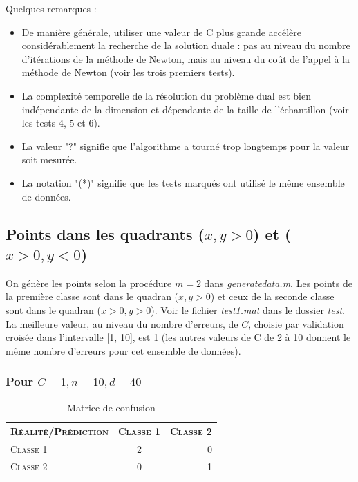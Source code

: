\documentclass{article}
\begin{document}
Quelques remarques :
\begin{itemize}
\item De manière générale, utiliser une valeur de C plus grande accélère considérablement la recherche de la solution duale : pas au niveau du nombre d'itérations de la méthode de Newton, mais au niveau du coût de l'appel à la méthode de Newton (voir les trois premiers tests). 
\item La complexité temporelle de la résolution du problème dual est bien indépendante de la dimension et dépendante de la taille de l'échantillon (voir les tests 4, 5 et 6).
\item La valeur "?" signifie que l'algorithme a tourné trop longtemps pour la valeur soit mesurée.
\item La notation "(*)" signifie que les tests marqués ont utilisé le même ensemble de données.
\end{itemize}

\subsection{Points dans les quadrants ($x, y > 0$) et ($x > 0, y < 0$)}

On génère les points selon la procédure $m = 2$ dans \emph{generatedata.m}. Les points de la première classe sont dans le quadran ($x, y > 0$) et ceux de la seconde classe sont dans le quadran ($x > 0, y > 0$). Voir le fichier \emph{test1.mat} dans le dossier \emph{test}. La meilleure valeur, au niveau du nombre d'erreurs, de $C$, choisie par validation croisée dans l'intervalle [1, 10], est 1 (les autres valeurs de C de 2 à 10 donnent le même nombre d'erreurs pour cet ensemble de données).

\subsubsection{Pour $C=1, n=10, d=40$}

     \begin{table}[H]
       \caption{Matrice de confusion}
       \begin{tabular}{|l|c|r|}
         \hline
         \textsc{Réalité/Prédiction} & \textsc{Classe 1} & \textsc{Classe 2}\\
         \hline
         \textsc{Classe 1} & 2 & 0\\
         \hline
         \textsc{Classe 2} & 0 & 1\\
         \hline
       \end{tabular}
     \end{table}
\end{document}
